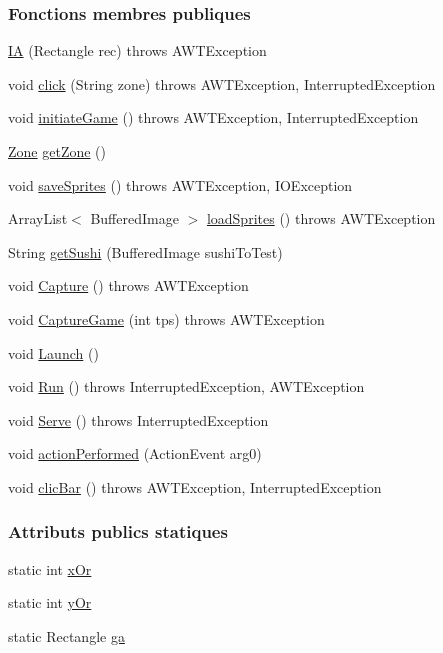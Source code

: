 \subsubsection*{Fonctions membres publiques}
\begin{DoxyCompactItemize}
\item 
\hyperlink{classIA_ac5567e7745fa95d02be55a502ba4eb54}{I\+A} (Rectangle rec)  throws A\+W\+T\+Exception 
\item 
void \hyperlink{classIA_af0e60d7ece7f50a3a7a5df8ca6c5d409}{click} (String zone)  throws A\+W\+T\+Exception, Interrupted\+Exception 
\item 
void \hyperlink{classIA_a0bf764584e254c4551de156962ae1e34}{initiate\+Game} ()  throws A\+W\+T\+Exception, Interrupted\+Exception 
\item 
\hyperlink{classZone}{Zone} \hyperlink{classIA_aa873ed13d9e2dc9572877397d6a02234}{get\+Zone} ()
\item 
void \hyperlink{classIA_a903fe1fd726b52cf01c1aa1e22320ae1}{save\+Sprites} ()  throws A\+W\+T\+Exception, I\+O\+Exception 
\item 
Array\+List$<$ Buffered\+Image $>$ \hyperlink{classIA_aa0afcde6a905b512450b54c1d7011732}{load\+Sprites} ()  throws A\+W\+T\+Exception 
\item 
String \hyperlink{classIA_a10fe21a4730bdf5d881225f8ab9a8c6f}{get\+Sushi} (Buffered\+Image sushi\+To\+Test)
\item 
void \hyperlink{classToolBox_a6e2363d41efa87ec225910f1665f04c9}{Capture} ()  throws A\+W\+T\+Exception 
\item 
void \hyperlink{classToolBox_a059e1404af5bcc5fbb1bb9dedfc20d66}{Capture\+Game} (int tps)  throws A\+W\+T\+Exception 
\item 
void \hyperlink{classToolBox_a84973bc465d7edad32f758829595c1da}{Launch} ()
\item 
void \hyperlink{classToolBox_aa0f5a8cb133c58a8d3ce98bc3e98d8ed}{Run} ()  throws Interrupted\+Exception, A\+W\+T\+Exception 
\item 
void \hyperlink{classToolBox_ad1cd486e0e4b502e023e0835638a9e0f}{Serve} ()  throws Interrupted\+Exception 
\item 
void \hyperlink{classToolBox_aa2c48c9b70735e54ed4123834ef9e5cf}{action\+Performed} (Action\+Event arg0)
\item 
void \hyperlink{classToolBox_ae3baa18f028039800f8c9fc07abf0931}{clic\+Bar} ()  throws A\+W\+T\+Exception, Interrupted\+Exception
\end{DoxyCompactItemize}
\subsubsection*{Attributs publics statiques}
\begin{DoxyCompactItemize}
\item 
static int \hyperlink{classIA_a7b2224d63b5c3c6f66456fa76d35ca17}{x\+Or}
\item 
static int \hyperlink{classIA_a715cc2f5ecfdcc10070efedae3ee1c1e}{y\+Or}
\item 
static Rectangle \hyperlink{classToolBox_a84023d6084fa90a7c5efb7802be85879}{ga}
\end{DoxyCompactItemize}
